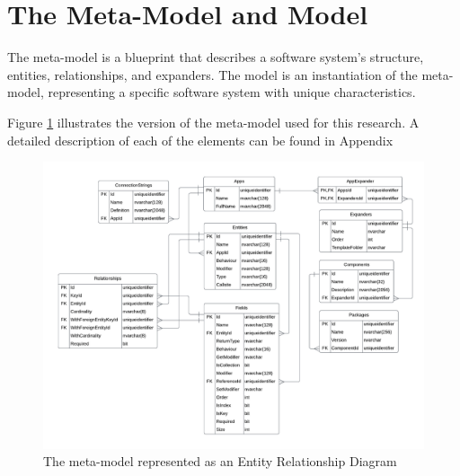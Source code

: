\section{The Meta-Model and Model} \label{sec_artifact_meta_model}

The meta-model is a blueprint that describes a software system's structure, entities,
relationships, and expanders. The model is an instantiation of the meta-model,
representing a specific software system with unique characteristics. 

Figure \ref{fig_erd} illustrates the version of the meta-model used for this research. A
detailed description of each of the elements can be found in Appendix

\begin{figure}[H]
    \centering
    \includegraphics[width=1\textwidth]{figures/erd.pdf}
    \caption[The meta-model represented as an Entity Relationship Diagram]{The meta-model represented as an Entity Relationship Diagram}
    \label{fig_erd}
\end{figure}